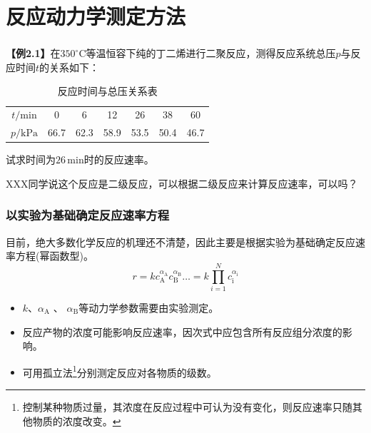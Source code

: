 \section{反应动力学测定方法}


\begin{frame}[t]
    \frametitle{}
    \begin{question}
        \textbf{【例2.1】}在$350^{\circ}\mathrm{C}$等温恒容下纯的丁二烯进行二聚反应，测得反应系统总压$p$与反应时间$t$的关系如下：

\begin{table}[h]
    \caption{反应时间与总压关系表}
    \centering
    \begin{tabular}{c c c c c c c}
        $t/\mathrm{min}$ & 0 & 6 & 12 & 26 & 38 & 60 \\
        $p/\mathrm{kPa}$ & 66.7 & 62.3 & 58.9 & 53.5 & 50.4 & 46.7 \\
    \end{tabular}
\end{table}

试求时间为$26\,\mathrm{min}$时的反应速率。

\tcblower

XXX同学说这个反应是二级反应，可以根据二级反应来计算反应速率，可以吗？
    \end{question}
\end{frame}


\begin{frame}
    \frametitle{以实验为基础确定反应速率方程}
    目前，绝大多数化学反应的机理还不清楚，因此主要是根据实验为基础确定反应速率方程(幂函数型)。
    \[
        r=kc_\mathrm{A}^{\alpha_\mathrm{A}}c_\mathrm{B}^{\alpha_\mathrm{B}}\ldots=k\prod_{i=1}^{N}c_\mathrm{i}^{\alpha_\mathrm{i}}
    \]
    
    \begin{itemize}
      \item $k$、$\alpha_\mathrm{A}$ 、 $\alpha_\mathrm{B}$等动力学参数需要由实验测定。
      \item 反应产物的浓度可能影响反应速率，因次式中应包含所有反应组分浓度的影响。
      \item 可用孤立法\footnote{控制某种物质过量，其浓度在反应过程中可认为没有变化，则反应速率只随其他物质的浓度改变。}分别测定反应对各物质的级数。
    \end{itemize}

\end{frame}


